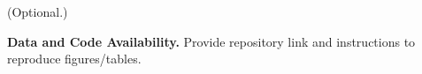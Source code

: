 \documentclass[sn-basic]{sn-jnl} %
\begin{document}
(Optional.)

\vspace{1em}
\noindent\textbf{Data and Code Availability.} Provide repository link and instructions to reproduce figures/tables.





%
\end{document}
